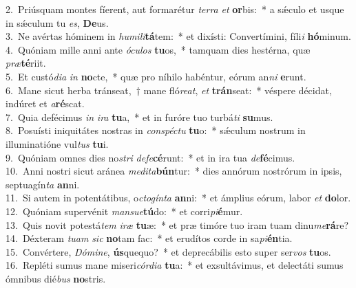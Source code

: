 {2.~}Priúsquam montes fíerent, aut formarétur \textit{ter}\textit{ra} \textit{et} \textbf{or}bis:~* a sǽculo et usque in sǽculum tu \textit{es}, \textbf{De}us.\\
{3.~}Ne avértas hóminem in \textit{hu}\textit{mi}\textit{li}\textbf{tá}tem:~* et dixísti: Convertímini, fíli\textit{i} \textbf{hó}minum.\\
{4.~}Quóniam mille anni ante \textit{ó}\textit{cu}\textit{los} \textbf{tu}os,~* tamquam dies hestérna, quæ \textit{præ}\textbf{té}riit.\\
{5.~}Et custó\textit{di}\textit{a} \textit{in} \textbf{no}cte,~* quæ pro níhilo habéntur, eórum an\textit{ni} \textbf{e}runt.\\
{6.~}Mane sicut herba tránseat,~† mane fló\textit{re}\textit{at}, \textit{et} \textbf{trán}seat:~* véspere décidat, indúret et \textit{a}\textbf{ré}scat.\\
{7.~}Quia defécimus \textit{in} \textit{i}\textit{ra} \textbf{tu}a,~* et in furóre tuo turbá\textit{ti} \textbf{su}mus.\\
{8.~}Posuísti iniquitátes nostras in \textit{con}\textit{spé}\textit{ctu} \textbf{tu}o:~* sǽculum nostrum in illuminatióne vul\textit{tus} \textbf{tu}i.\\
{9.~}Quóniam omnes dies no\textit{stri} \textit{de}\textit{fe}\textbf{cé}runt:~* et in ira tua \textit{de}\textbf{fé}cimus.\\
{10.~}Anni nostri sicut aránea \textit{me}\textit{di}\textit{ta}\textbf{bún}tur:~* dies annórum nostrórum in ipsis, septuagín\textit{ta} \textbf{an}ni.\\
{11.~}Si autem in potentátibus, o\textit{cto}\textit{gín}\textit{ta} \textbf{an}ni:~* et ámplius eórum, labor \textit{et} \textbf{do}lor.\\
{12.~}Quóniam supervénit \textit{man}\textit{su}\textit{e}\textbf{tú}do:~* et corri\textit{pi}\textbf{é}mur.\\
{13.~}Quis novit potestá\textit{tem} \textit{i}\textit{ræ} \textbf{tu}æ:~* et præ timóre tuo iram tuam dinu\textit{me}\textbf{rá}re?\\
{14.~}Déxteram \textit{tu}\textit{am} \textit{sic} \textbf{no}tam fac:~* et erudítos corde in sa\textit{pi}\textbf{én}tia.\\
{15.~}Convértere, \textit{Dó}\textit{mi}\textit{ne}, \textbf{ús}quequo?~* et deprecábilis esto super ser\textit{vos} \textbf{tu}os.\\
{16.~}Repléti sumus mane miseri\textit{cór}\textit{di}\textit{a} \textbf{tu}a:~* et exsultávimus, et delectáti sumus ómnibus dié\textit{bus} \textbf{no}stris.\\
